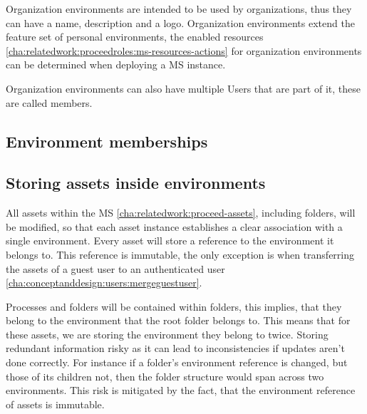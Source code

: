 Organization environments are intended to be used by organizations, thus they can have a
name, description and a logo.
Organization environments extend the feature set of personal environments, the enabled
resources \ref{cha:relatedwork:proceedroles:ms-resources-actions} for organization
environments can be determined when deploying a MS instance.

Organization environments can also have multiple Users that are part of it, these are
called members.

\subsection{Environment memberships}
\label{cha:conceptanddesign:environments:memberships}

\subsection{Storing assets inside environments}
\label{cha:conceptanddesign:environments:storing-assets}

All assets within the MS \ref{cha:relatedwork:proceed-assets}, including folders,
will be modified, so that each asset instance establishes a clear association with a single environment.
Every asset will store a reference to the environment it belongs to.
This reference is immutable, the only exception is when transferring the assets of a guest
user to an authenticated user \ref{cha:conceptanddesign:users:mergeguestuser}.

Processes and folders will be contained within folders, this implies, that they belong to
the environment that the root folder belongs to.
This means that for these assets, we are storing the environment they belong to twice.
Storing redundant information risky as it can lead to inconsistencies if updates aren't
done correctly.
For instance if a folder's environment reference is changed, but those of its children
not, then the folder structure would span across two environments.
This risk is mitigated by the fact, that the environment reference of assets is immutable.





